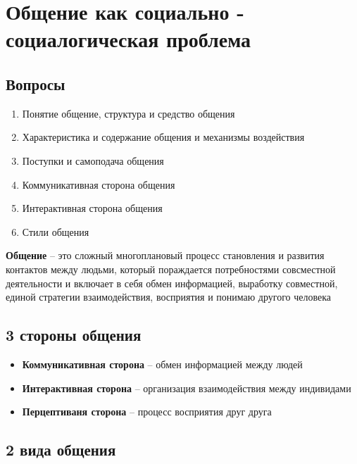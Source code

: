 \chapter{Общение как социально - социалогическая проблема}

\section{Вопросы}

\begin{enumerate}
    \item Понятие общение, структура и средство общения
    \item Характеристика и содержание общения и механизмы воздействия
    \item Поступки и самоподача общения
    \item Коммуникативная сторона общения
    \item Интерактивная сторона общения
    \item Стили общения
\end{enumerate}

\textbf{Общение} -- это сложный многоплановый процесс становления
и развития контактов между людьми, который пораждается потребностями
совсместной деятельности и включает в себя обмен информацией,
выработку совместной, единой стратегии взаимодействия, восприятия и 
понимаю другого человека

\section{3 стороны общения}

\begin{itemize}
    \item \textbf{Коммуникативная сторона} --
        обмен информацией между людей
    \item \textbf{Интерактивная сторона} --
        организация взаимодействия между индивидами
    \item \textbf{Перцептиваня сторона} --
        процесс восприятия друг друга
\end{itemize}

\section{2 вида общения}

